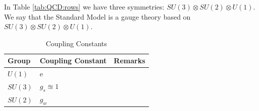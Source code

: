 \documentclass[]{article}
\begin{document}
In Table \ref{tab:QCD:rows} we have three symmetries: $SU(3) \otimes SU(2) \otimes U(1)$. We say that the Standard Model is a gauge theory based on  $SU(3) \otimes SU(2) \otimes U(1)$.

\begin{table}[H]
	\begin{center}
		\caption{Coupling Constants}
		\begin{tabular}{|l|l|l|} \hline
			Group&Coupling Constant&Remarks \\ \hline
			$U(1)$&e& \\ \hline
			$SU(3)$&$g_s \approxeq 1$& \\ \hline
			$SU(2)$&$g_w$& \\ \hline
		\end{tabular}
	\end{center}
\end{table}
\end{document}
